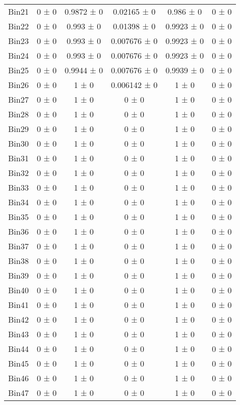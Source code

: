\begin{tabular}{@{\extracolsep{4pt}}lccccc@{}}
     Bin21 & 0 ± 0 & 0.9872 ± 0 & 0.02165 ± 0 & 0.986 ± 0 & 0 ± 0 \\ 
     Bin22 & 0 ± 0 & 0.993 ± 0 & 0.01398 ± 0 & 0.9923 ± 0 & 0 ± 0 \\ 
     Bin23 & 0 ± 0 & 0.993 ± 0 & 0.007676 ± 0 & 0.9923 ± 0 & 0 ± 0 \\ 
     Bin24 & 0 ± 0 & 0.993 ± 0 & 0.007676 ± 0 & 0.9923 ± 0 & 0 ± 0 \\ 
     Bin25 & 0 ± 0 & 0.9944 ± 0 & 0.007676 ± 0 & 0.9939 ± 0 & 0 ± 0 \\ 
     Bin26 & 0 ± 0 & 1 ± 0 & 0.006142 ± 0 & 1 ± 0 & 0 ± 0 \\ 
     Bin27 & 0 ± 0 & 1 ± 0 & 0 ± 0 & 1 ± 0 & 0 ± 0 \\ 
     Bin28 & 0 ± 0 & 1 ± 0 & 0 ± 0 & 1 ± 0 & 0 ± 0 \\ 
     Bin29 & 0 ± 0 & 1 ± 0 & 0 ± 0 & 1 ± 0 & 0 ± 0 \\ 
     Bin30 & 0 ± 0 & 1 ± 0 & 0 ± 0 & 1 ± 0 & 0 ± 0 \\ 
     Bin31 & 0 ± 0 & 1 ± 0 & 0 ± 0 & 1 ± 0 & 0 ± 0 \\ 
     Bin32 & 0 ± 0 & 1 ± 0 & 0 ± 0 & 1 ± 0 & 0 ± 0 \\ 
     Bin33 & 0 ± 0 & 1 ± 0 & 0 ± 0 & 1 ± 0 & 0 ± 0 \\ 
     Bin34 & 0 ± 0 & 1 ± 0 & 0 ± 0 & 1 ± 0 & 0 ± 0 \\ 
     Bin35 & 0 ± 0 & 1 ± 0 & 0 ± 0 & 1 ± 0 & 0 ± 0 \\ 
     Bin36 & 0 ± 0 & 1 ± 0 & 0 ± 0 & 1 ± 0 & 0 ± 0 \\ 
     Bin37 & 0 ± 0 & 1 ± 0 & 0 ± 0 & 1 ± 0 & 0 ± 0 \\ 
     Bin38 & 0 ± 0 & 1 ± 0 & 0 ± 0 & 1 ± 0 & 0 ± 0 \\ 
     Bin39 & 0 ± 0 & 1 ± 0 & 0 ± 0 & 1 ± 0 & 0 ± 0 \\ 
     Bin40 & 0 ± 0 & 1 ± 0 & 0 ± 0 & 1 ± 0 & 0 ± 0 \\ 
     Bin41 & 0 ± 0 & 1 ± 0 & 0 ± 0 & 1 ± 0 & 0 ± 0 \\ 
     Bin42 & 0 ± 0 & 1 ± 0 & 0 ± 0 & 1 ± 0 & 0 ± 0 \\ 
     Bin43 & 0 ± 0 & 1 ± 0 & 0 ± 0 & 1 ± 0 & 0 ± 0 \\ 
     Bin44 & 0 ± 0 & 1 ± 0 & 0 ± 0 & 1 ± 0 & 0 ± 0 \\ 
     Bin45 & 0 ± 0 & 1 ± 0 & 0 ± 0 & 1 ± 0 & 0 ± 0 \\ 
     Bin46 & 0 ± 0 & 1 ± 0 & 0 ± 0 & 1 ± 0 & 0 ± 0 \\ 
     Bin47 & 0 ± 0 & 1 ± 0 & 0 ± 0 & 1 ± 0 & 0 ± 0 \\ 

\end{tabular}
